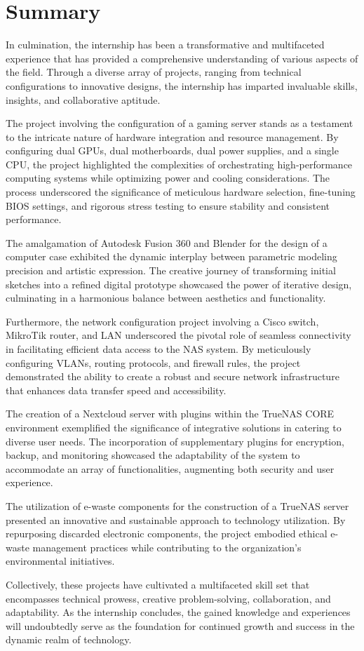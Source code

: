 \section{Summary}
In culmination, the internship has been a transformative and multifaceted experience that has provided a comprehensive understanding of various aspects of the field. Through a diverse array of projects, ranging from technical configurations to innovative designs, the internship has imparted invaluable skills, insights, and collaborative aptitude.

The project involving the configuration of a gaming server stands as a testament to the intricate nature of hardware integration and resource management. By configuring dual GPUs, dual motherboards, dual power supplies, and a single CPU, the project highlighted the complexities of orchestrating high-performance computing systems while optimizing power and cooling considerations. The process underscored the significance of meticulous hardware selection, fine-tuning BIOS settings, and rigorous stress testing to ensure stability and consistent performance.

The amalgamation of Autodesk Fusion 360 and Blender for the design of a computer case exhibited the dynamic interplay between parametric modeling precision and artistic expression. The creative journey of transforming initial sketches into a refined digital prototype showcased the power of iterative design, culminating in a harmonious balance between aesthetics and functionality.

Furthermore, the network configuration project involving a Cisco switch, MikroTik router, and LAN underscored the pivotal role of seamless connectivity in facilitating efficient data access to the NAS system. By meticulously configuring VLANs, routing protocols, and firewall rules, the project demonstrated the ability to create a robust and secure network infrastructure that enhances data transfer speed and accessibility.

The creation of a Nextcloud server with plugins within the TrueNAS CORE environment exemplified the significance of integrative solutions in catering to diverse user needs. The incorporation of supplementary plugins for encryption, backup, and monitoring showcased the adaptability of the system to accommodate an array of functionalities, augmenting both security and user experience.

The utilization of e-waste components for the construction of a TrueNAS server presented an innovative and sustainable approach to technology utilization. By repurposing discarded electronic components, the project embodied ethical e-waste management practices while contributing to the organization's environmental initiatives.

Collectively, these projects have cultivated a multifaceted skill set that encompasses technical prowess, creative problem-solving, collaboration, and adaptability. As the internship concludes, the gained knowledge and experiences will undoubtedly serve as the foundation for continued growth and success in the dynamic realm of technology.


